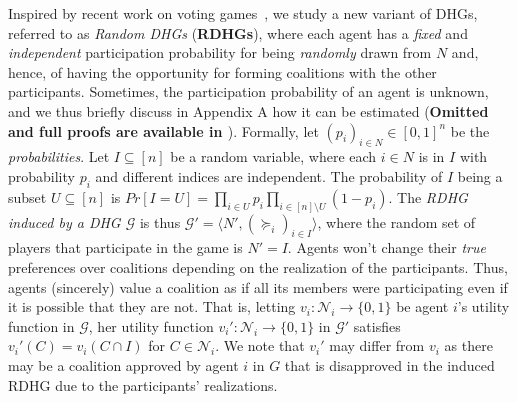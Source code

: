 \documentclass[letterpaper]{article}
\begin{document}
Inspired by recent work on voting games~\cite{imber2021probabilistic}, %
we study a new variant of DHGs, referred to as \textit{Random DHGs} (\textbf{RDHGs}), where each agent has a \textit{fixed} and \textit{independent} participation probability for being \textit{randomly} drawn from $N$ and, hence, of having the opportunity for forming coalitions with the other participants. Sometimes, the participation probability of an agent is unknown, and we thus briefly discuss in Appendix A how it can be estimated (\textbf{Omitted and full proofs are available in \cite{supplementary}}). %
Formally, let $(p_i)_{i \in N} \in [0,1]^n$ be the \textit{probabilities}. Let $I \subseteq [n]$ be a random variable, where each $i \in N$ is in $I$ with probability $p_i$ and different indices are independent. The probability of $I$ being a subset $U \subseteq [n]$ is $Pr[I = U] = \prod_{i \in U} p_i \prod_{i \in [n] \setminus U} (1-p_i)$. The \textit{RDHG induced by a DHG $\mathcal{G}$} is thus $\mathcal{G}' = \langle N', (\succeq_i)_{i \in I} \rangle$, where the random set of players that participate in the game is $N' = I$. Agents won’t change their \textit{true} preferences over coalitions depending on the realization of the participants. Thus, agents (sincerely) value a coalition as if all its members were participating even if it is possible that they are not. That is, letting $v_i: \mathcal{N}_i \rightarrow \{0,1\}$ be agent $i$'s utility function in $\mathcal{G}$, her utility function $v_i': \mathcal{N}_i \rightarrow \{0,1\}$ in $\mathcal{G}'$ satisfies $v_i'(C) = v_i(C \cap I)$ for $C \in \mathcal{N}_i$. We note that $v_i'$ may differ from $v_i$ as there may be a coalition approved by agent $i$ in $G$ that is disapproved in the induced RDHG due to the participants' realizations.
\end{document}
